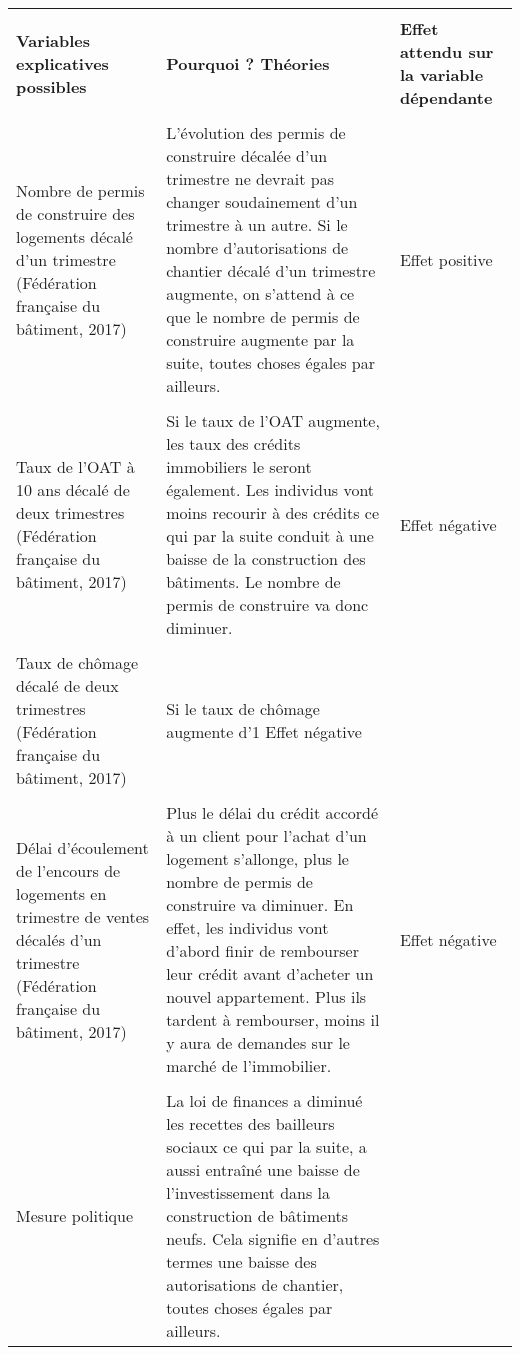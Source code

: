 \documentclass[11pt,]{article}
\begin{document}
\begin{longtable}{p{5cm} | p{5cm} | p{5cm}}
\\[-1.8ex]
\hline \\[-1.8ex]
\textbf{Variables explicatives possibles} &
    \textbf{Pourquoi ? Théories} & 
        \textbf{Effet attendu sur la variable dépendante} \\
\hline \\[-1.8ex]
Nombre de permis de construire des logements décalé d’un trimestre (Fédération française du bâtiment, 2017) &
    L’évolution des permis de construire décalée d’un trimestre ne devrait pas changer soudainement d’un trimestre à un autre. Si le nombre d’autorisations de chantier décalé d’un trimestre augmente, on s’attend à ce que le nombre de permis de construire augmente par la suite, toutes choses égales par ailleurs. & 
        Effet positive \\
\hline \\[-1.8ex]
Taux de l’OAT à 10 ans décalé de deux trimestres (Fédération française du bâtiment, 2017) & 
    Si le taux de l’OAT augmente, les taux des crédits immobiliers le seront également. Les individus vont moins recourir à des crédits ce qui par la suite conduit à une baisse de la construction des bâtiments. Le nombre de permis de construire va donc diminuer. &
        Effet négative \\
\hline \\[-1.8ex]
Taux de chômage décalé de deux trimestres (Fédération française du bâtiment, 2017) & 
    Si le taux de chômage augmente d’1%
        Effet négative \\
\hline \\[-1.8ex]
Délai d’écoulement de l’encours de logements en trimestre de ventes décalés d’un trimestre (Fédération française du bâtiment, 2017) & 
    Plus le délai du crédit accordé à un client pour l’achat d’un logement s’allonge, plus le nombre de permis de construire va diminuer. En effet, les individus vont d’abord finir de rembourser leur crédit avant d’acheter un nouvel appartement. Plus ils tardent à rembourser, moins il y aura de demandes sur le marché de l’immobilier. & 
        Effet négative \\
\hline \\[-1.8ex]
Mesure politique & 
    La loi de finances a diminué les recettes des bailleurs sociaux ce qui par la suite, a aussi entraîné une baisse de l’investissement dans la construction de bâtiments neufs. Cela signifie en d’autres termes une baisse des autorisations de chantier, toutes choses égales par ailleurs. & 

\end{longtable}
\end{document}
